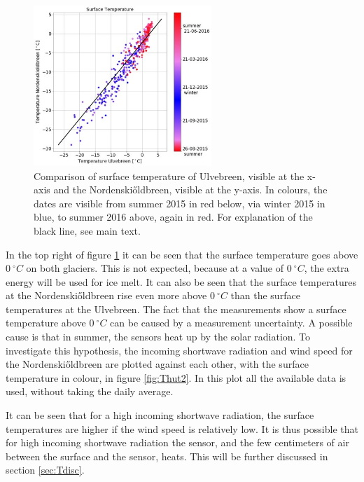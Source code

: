 \documentclass[11pt]{report}
\begin{document}
\begin{figure}[H]
\centering{}
    \includegraphics[scale=1, width=0.6\textwidth]{Tsurf.jpg}
    \caption{Comparison of surface temperature of Ulvebreen, visible at the x-axis and the Nordenski\H{o}ldbreen, visible at the y-axis. In colours, the dates are visible from summer 2015 in red below, via winter 2015 in blue, to summer 2016 above, again in red. For explanation of the black line, see main text.}
    \label{fig:Tsurf}
\end{figure}

In the top right of figure \ref{fig:Tsurf} it can be seen that the surface temperature goes above $\SI{0}{^\circ C}$ on both glaciers. This is not expected, because at a value of $\SI{0}{^\circ C}$, the extra energy will be used for ice melt. It can also be seen that the surface temperatures at the Nordenski\H{o}ldbreen rise even more above $\SI{0}{^\circ C}$ than the surface temperatures at the Ulvebreen. The fact that the measurements show a surface temperature above $\SI{0}{^\circ C}$ can be caused by a measurement uncertainty. A possible cause is that in summer, the sensors heat up by the solar radiation. To investigate this hypothesis, the incoming shortwave radiation and wind speed for the Nordenski\H{o}ldbreen are plotted against each other, with the surface temperature in colour, in figure \ref{fig:Thut2}. In this plot all the available data is used, without taking the daily average. 

\newpage
It can be seen that for a high incoming shortwave radiation, the surface temperatures are higher if the wind speed is relatively low. It is thus possible that for high incoming shortwave radiation the sensor, and the few centimeters of air between the surface and the sensor, heats. This will be further discussed in section \ref{sec:Tdisc}.
\end{document}
